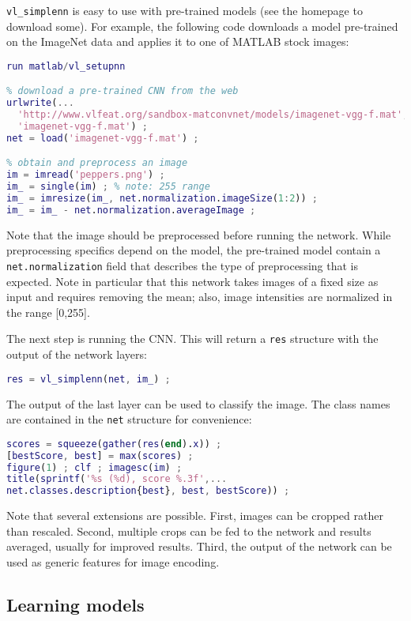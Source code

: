 \documentclass[12pt]{article}
\begin{document}
\verb!vl_simplenn! is easy to use with pre-trained models (see the homepage to download some). For example, the following code downloads a model pre-trained on the ImageNet data and applies it to one of MATLAB stock images:
\begin{lstlisting}[language=Matlab]
% setup MatConvNet in MATLAB
run matlab/vl_setupnn

% download a pre-trained CNN from the web
urlwrite(...
  'http://www.vlfeat.org/sandbox-matconvnet/models/imagenet-vgg-f.mat', ...
  'imagenet-vgg-f.mat') ;
net = load('imagenet-vgg-f.mat') ;

% obtain and preprocess an image
im = imread('peppers.png') ;
im_ = single(im) ; % note: 255 range
im_ = imresize(im_, net.normalization.imageSize(1:2)) ;
im_ = im_ - net.normalization.averageImage ;
\end{lstlisting}
Note that the image should be preprocessed before running the network. While preprocessing specifics depend on the model, the pre-trained model contain a \verb!net.normalization! field that describes the type of preprocessing that is expected. Note in particular that this network takes images of a fixed size as input and requires removing the mean; also, image intensities are normalized in the range [0,255].

The next step is running the CNN. This will return a \verb!res! structure with the output of the network layers:
\begin{lstlisting}[language=Matlab]
% run the CNN
res = vl_simplenn(net, im_) ;
\end{lstlisting}

The output of the last layer can be used to classify the image. The class names are contained in the \verb!net! structure for convenience:
\begin{lstlisting}[language=Matlab]
% show the classification result
scores = squeeze(gather(res(end).x)) ;
[bestScore, best] = max(scores) ;
figure(1) ; clf ; imagesc(im) ;
title(sprintf('%s (%d), score %.3f',...
net.classes.description{best}, best, bestScore)) ;
\end{lstlisting}

Note that several extensions are possible. First, images can be cropped rather than rescaled. Second, multiple crops can be fed to the network and results averaged, usually for improved results. Third, the output of the network can be used as generic features for image encoding.

\subsection{Learning models}
\end{document}
